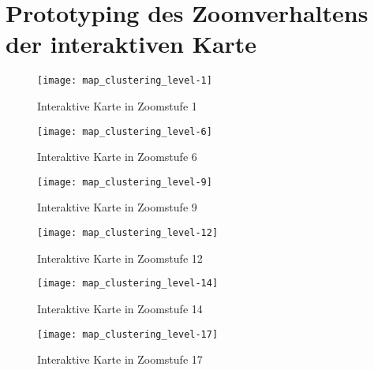 \section{Prototyping des Zoomverhaltens der interaktiven Karte} \label{appendix:map_flow}

\begin{figure}[H]
  \centering
  \texttt{[image: map\_clustering\_level-1]}
  \caption{Interaktive Karte in Zoomstufe 1}
  \label{fig:map_clustering_level-1}
\end{figure}
\begin{figure}[H]
  \centering
  \texttt{[image: map\_clustering\_level-6]}
  \caption{Interaktive Karte in Zoomstufe 6}
  \label{fig:map_clustering_level-6}
\end{figure}
\begin{figure}[H]
  \centering
  \texttt{[image: map\_clustering\_level-9]}
  \caption{Interaktive Karte in Zoomstufe 9}
  \label{fig:map_clustering_level-9}
\end{figure}
\begin{figure}[H]
  \centering
  \texttt{[image: map\_clustering\_level-12]}
  \caption{Interaktive Karte in Zoomstufe 12}
  \label{fig:map_clustering_level-12}
\end{figure}
\begin{figure}[H]
  \centering
  \texttt{[image: map\_clustering\_level-14]}
  \caption{Interaktive Karte in Zoomstufe 14}
  \label{fig:map_clustering_level-14}
\end{figure}
\begin{figure}[H]
  \centering
  \texttt{[image: map\_clustering\_level-17]}
  \caption{Interaktive Karte in Zoomstufe 17}
  \label{fig:map_clustering_level-17}
\end{figure}
